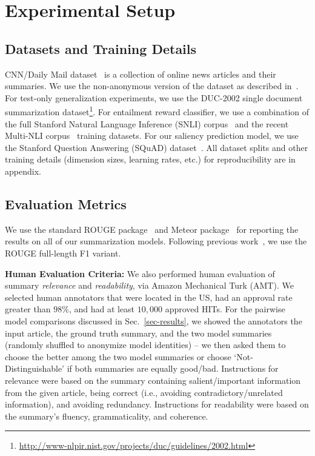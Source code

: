 \documentclass[11pt,a4paper]{article}
\begin{document}
 

\section{Experimental Setup}
\label{sec-setup}

\subsection{Datasets and Training Details}
\label{subsec:datasets}
CNN/Daily Mail dataset~\cite{hermann2015teaching,nallapati2016abstractive} is a collection of online news articles and their summaries. We use the non-anonymous version of the dataset as described in~. For test-only generalization experiments, we use the DUC-2002 single document summarization dataset\footnote{\scriptsize{\url{http://www-nlpir.nist.gov/projects/duc/guidelines/2002.html}}}.
For entailment reward classifier, we use a combination of the full Stanford Natural Language Inference (SNLI) corpus~\cite{bowman2015large} and the recent Multi-NLI corpus~\cite{williams2017broad} training datasets.
For our saliency prediction model, we use the Stanford Question Answering (SQuAD) dataset~\cite{rajpurkar2016squad}. All dataset splits and other training details (dimension sizes, learning rates, etc.) for reproducibility are in appendix.

\subsection{Evaluation Metrics}
\label{subsec:evaluation-metrics}
We use the standard ROUGE package~\cite{lin2004rouge} and Meteor package~\cite{banerjee2005meteor} for reporting the results on all of our summarization models. Following previous work~\cite{chopra2016abstractive,nallapati2016abstractive,see2017get}, we use the ROUGE full-length F1 variant.

\noindent\textbf{Human Evaluation Criteria:}
We also performed human evaluation of summary \emph{relevance} and \emph{readability}, via Amazon Mechanical Turk (AMT). We selected human annotators that were located in the US, had an approval rate greater than $98\%$, and had at least $10,000$ approved HITs. For the pairwise model comparisons discussed in Sec.~\ref{sec-results}, we showed the annotators the input article, the ground truth summary, and the two model summaries (randomly shuffled to anonymize model identities) -- we then asked them to choose the better among the two model summaries or choose `Not-Distinguishable' if both summaries are equally good/bad. Instructions for relevance were based on the summary containing salient/important information from the given article, being correct (i.e., avoiding contradictory/unrelated information), and avoiding redundancy. Instructions for readability were based on the summary's fluency, grammaticality, and coherence.
\end{document}
